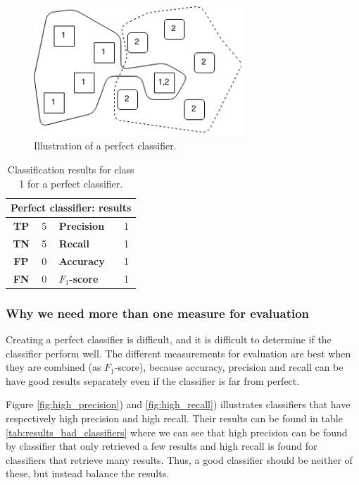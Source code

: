 \begin{figure}[h]
\centering
\includegraphics[width=0.7\textwidth]{Chapters/Methods/Perfect_classifier}
\caption{Illustration of a perfect classifier.}
\label{fig:perfect_classifier}
\end{figure}

\begin{table}[h]
\centering
\renewcommand{\arraystretch}{1.25}
\begin{tabular}{c|l|l|l}
\multicolumn{4}{c}{\textbf{Perfect classifier: results}} \\ \hline
\textbf{TP} & 5 &\textbf{Precision} & 1 \\ \hline
\textbf{TN} & 5 &\textbf{Recall} & 1 \\ \hline
\textbf{FP} & 0 &\textbf{Accuracy} & 1 \\ \hline
\textbf{FN} & 0 &\textbf{$F_{1}$-score} & 1
\end{tabular}
\caption{Classification results for class 1 for a perfect classifier.}
\label{tab:results_perfect_classifier}
\end{table}

\subsubsection{Why we need more than one measure for evaluation}
Creating a perfect classifier is difficult, and it is difficult to determine if the classifier perform well. The different measurements for evaluation are best when they are combined (as $F_{1}$-score), because accuracy, precision and recall can be have good results separately even if the classifier is far from perfect.  

Figure \ref{fig:high_precision}) and \ref{fig:high_recall}) illustrates classifiers that have respectively high precision and high recall. Their results can be found in table \ref{tab:results_bad_classifiers} where we can see that high precision can be found by classifier that only retrieved a few results and high recall is found for classifiers that retrieve many results. Thus, a good classifier should be neither of these, but instead balance the results. 


